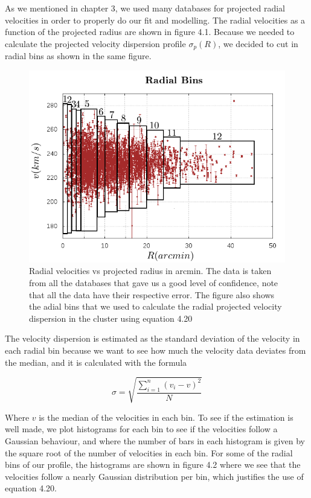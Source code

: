 As we mentioned in chapter 3, we used many databases for projected radial velocities in order to properly do our fit and modelling. The radial velocities as a function of the projected radius are shown in figure 4.1. Because we needed to calculate the projected velocity dispersion profile $\sigma_{p}(R)$, we decided to cut in radial bins as shown in the same figure.

\begin{figure}[]
\centering
\includegraphics[width=13cm]{images/vel_vs_rad_bins.png}
\caption[Radial bins used to calculate velocity dispersions]{Radial velocities vs projected radius in arcmin. The data is taken from all the databases that gave us a good level of confidence, note that all the data have their respective error. The figure also shows the adial bins that we used to calculate the radial projected velocity dispersion in the cluster using equation 4.20}
\end{figure}

The velocity dispersion is estimated as the standard deviation of the velocity in each radial bin because we want to see how much the velocity data deviates from the median, and it is calculated with the formula

\begin{equation}
\sigma = \sqrt{\frac{\sum_{i=1}^{n}\left(v_{i}-v\right)^{2}}{N}}
\end{equation}

Where $v$ is the median of the velocities in each bin. To see if the estimation is well made, we plot histograms for each bin to see if the velocities follow a Gaussian behaviour, and where the number of bars in each histogram is given by the square root of the number of velocities in each bin. For some of the radial bins of our profile, the histograms are shown in figure 4.2 where we see that the velocities follow a nearly Gaussian distribution per bin, which justifies the use of equation 4.20.

